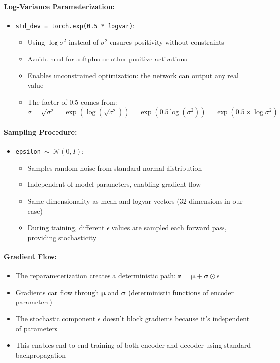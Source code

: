 \documentclass[conference]{IEEEtran}
\newcommand{\logvar}{\log \sigma^2}
\begin{document}
\paragraph{Log-Variance Parameterization:}
\begin{itemize}
    \item \texttt{std\_dev = torch.exp(0.5 * logvar)}: 
    \begin{itemize}
        \item Using $\logvar$ instead of $\sigma^2$ ensures positivity without constraints
        \item Avoids need for softplus or other positive activations
        \item Enables unconstrained optimization: the network can output any real value
        \item The factor of 0.5 comes from: $\sigma = \sqrt{\sigma^2} = \exp(\log(\sqrt{\sigma^2})) = \exp(0.5 \log(\sigma^2)) = \exp(0.5 \times \logvar)$
    \end{itemize}
\end{itemize}

\paragraph{Sampling Procedure:}
\begin{itemize}
    \item \texttt{epsilon $\sim$ $\mathcal{N}(0,I)$}: 
    \begin{itemize}
        \item Samples random noise from standard normal distribution
        \item Independent of model parameters, enabling gradient flow
        \item Same dimensionality as mean and logvar vectors (32 dimensions in our case)
        \item During training, different $\epsilon$ values are sampled each forward pass, providing stochasticity
    \end{itemize}
\end{itemize}

\paragraph{Gradient Flow:}
\begin{itemize}
    \item The reparameterization creates a deterministic path: $\mathbf{z} = \boldsymbol{\mu} + \boldsymbol{\sigma} \odot \epsilon$
    \item Gradients can flow through $\boldsymbol{\mu}$ and $\boldsymbol{\sigma}$ (deterministic functions of encoder parameters)
    \item The stochastic component $\epsilon$ doesn't block gradients because it's independent of parameters
    \item This enables end-to-end training of both encoder and decoder using standard backpropagation
\end{itemize}
\end{document}
